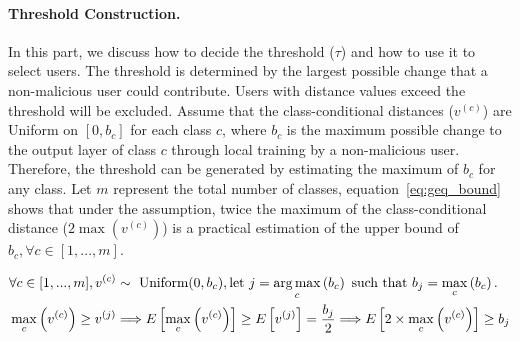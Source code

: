 \documentclass{article} %
\newcommand{\yli}[1]{{\color{cyan}#1}}
\begin{document}
\paragraph{Threshold Construction.} In this part, we discuss how to decide the threshold ($\tau$) and how to use it to select users. \yli{The threshold is determined by the largest possible change that a non-malicious user could contribute. Users with distance values exceed the threshold will be excluded.}
Assume that the class-conditional distances ($v^{(c)}$) are Uniform on $[0, b_c]$ for each class $c$, where $b_c$ is the maximum possible change to the output layer of class $c$ through local training by a non-malicious user. 
Therefore, the threshold can be generated by estimating the maximum of $b_c$ for any class. 
Let $m$ represent the total number of classes, equation~\ref{eq:geq_bound} shows that under the assumption, twice the maximum of the class-conditional distance ($2\max(v^{(c)})$) is a practical estimation of the upper bound of $b_c, \forall c\in [1,...,m]$.

\vspace{-10pt}
\begin{align}
    &\forall c \in [1,...,m], v^{(c)} \sim \textrm{ Uniform}(0, b_c), \textrm{let } j = \operatorname*{arg\,max}_c \left( b_c \right) \textrm{ such that } b_j = \max_c \left( b_c \right). \nonumber \\
    &\max_c \left( v^{(c)} \right) \geq v^{(j)} \Longrightarrow E \left[ \max_c \left( v^{(c)} \right) \right] \geq E \left[ v^{(j)} \right] = \dfrac{b_j}{2}  \Longrightarrow E \left[ 2 \times \max_c \left( v^{(c)} \right) \right] \geq b_j \label{eq:geq_bound} 
\end{align}
\vspace{-10pt}
\end{document}
